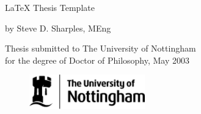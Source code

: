 \begin{titlepage}

\Huge 
\begin{center}

\vspace*{4cm}
\LaTeX{} Thesis Template

\vspace{3cm}

\LARGE

by Steve D. Sharples, MEng

\vspace{3cm}


Thesis submitted to The University of Nottingham \\
for the degree of Doctor of Philosophy, May 2003

\vspace{4cm}

\begin{figure}[h]
\centering
\includegraphics[width=5cm]{uni_logo}
\end{figure}



\end{center}

\end{titlepage}

